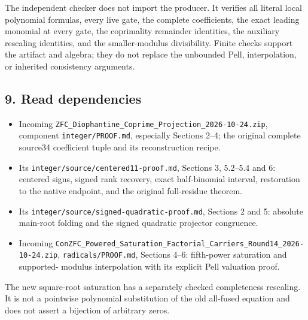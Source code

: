 The independent checker does not import the producer. It verifies all literal local polynomial formulas, every live gate, the complete coefficients, the exact leading monomial at every gate, the coprimality remainder identities, the auxiliary rescaling identities, and the smaller-modulus divisibility. Finite checks support the artifact and algebra; they do not replace the unbounded Pell, interpolation, or inherited consistency arguments.



\subsection{9. Read dependencies}



\begin{itemize}

\item Incoming \texttt{ZFC\_\allowbreak{}Diophantine\_\allowbreak{}Coprime\_\allowbreak{}Projection\_\allowbreak{}2026-10-24.zip}, component \texttt{integer/\allowbreak{}PROOF.md}, especially Sections 2--4; the original complete source34 coefficient tuple and its reconstruction recipe.

\item Its \texttt{integer/\allowbreak{}source/\allowbreak{}centered11-proof.md}, Sections 3, 5.2--5.4 and 6: centered signs, signed rank recovery, exact half-binomial interval, restoration to the native endpoint, and the original full-residue theorem.

\item Its \texttt{integer/\allowbreak{}source/\allowbreak{}signed-quadratic-proof.md}, Sections 2 and 5: absolute main-root folding and the signed quadratic projector congruence.

\item Incoming \texttt{ConZFC\_\allowbreak{}Powered\_\allowbreak{}Saturation\_\allowbreak{}Factorial\_\allowbreak{}Carriers\_\allowbreak{}Round14\_\allowbreak{}2026-10-24.zip}, \texttt{radicals/\allowbreak{}PROOF.md}, Sections 4--6: fifth-power saturation and supported- modulus interpolation with its explicit Pell valuation proof.

\end{itemize}



The new square-root saturation has a separately checked completeness rescaling. It is not a pointwise polynomial substitution of the old all-fused equation and does not assert a bijection of arbitrary zeros.





